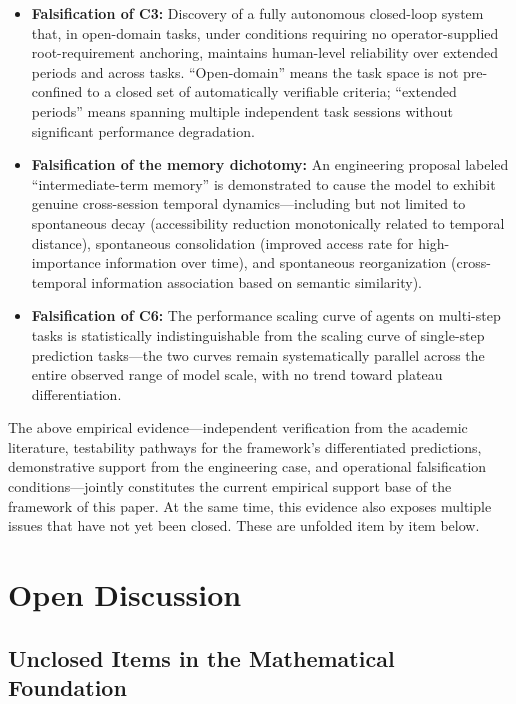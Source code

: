 \documentclass[11pt,a4paper]{article}
\theoremstyle{definition}
\begin{document}
\begin{itemize}[leftmargin=*,itemsep=0.3em]
    \item \textbf{Falsification of C3:} Discovery of a fully autonomous closed-loop system that, in open-domain tasks, under conditions requiring no operator-supplied root-requirement anchoring, maintains human-level reliability over extended periods and across tasks. ``Open-domain'' means the task space is not pre-confined to a closed set of automatically verifiable criteria; ``extended periods'' means spanning multiple independent task sessions without significant performance degradation.
    \item \textbf{Falsification of the memory dichotomy:} An engineering proposal labeled ``intermediate-term memory'' is demonstrated to cause the model to exhibit genuine cross-session temporal dynamics---including but not limited to spontaneous decay (accessibility reduction monotonically related to temporal distance), spontaneous consolidation (improved access rate for high-importance information over time), and spontaneous reorganization (cross-temporal information association based on semantic similarity).
    \item \textbf{Falsification of C6:} The performance scaling curve of agents on multi-step tasks is statistically indistinguishable from the scaling curve of single-step prediction tasks---the two curves remain systematically parallel across the entire observed range of model scale, with no trend toward plateau differentiation.
\end{itemize}

The above empirical evidence---independent verification from the academic literature, testability pathways for the framework's differentiated predictions, demonstrative support from the engineering case, and operational falsification conditions---jointly constitutes the current empirical support base of the framework of this paper. At the same time, this evidence also exposes multiple issues that have not yet been closed. These are unfolded item by item below.

\section{Open Discussion}
\label{sec:open}

\subsection{Unclosed Items in the Mathematical Foundation}
\end{document}
